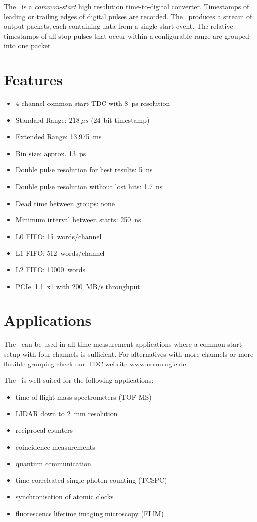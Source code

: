 The \deviceName\ is a \emph{common-start} high resolution time-to-digital converter. 
Timestamps of leading or trailing edges of digital pulses are recorded. 
The \deviceName\ produces a stream of output packets, each containing data from a single start event. 
The relative timestamps of all stop pulses that occur within a configurable range are grouped into one packet.

\section{Features}
	\begin{itemize}
		\item 4 channel common start TDC with 8~ps resolution
		\item Standard Range: $218~\mu s$ (24~bit timestamp)
		\item Extended Range: 13.975~ms
		\item Bin size: approx. 13~ps
		\item Double pulse resolution for best results: 5~ns
		\item Double pulse resolution without lost hits: 1.7~ns
		\item Dead time between groups: none
		\item Minimum interval between starts: 250~ns
		\item L0 FIFO: 15~words/channel
		\item L1 FIFO: 512~words/channel
		\item L2 FIFO: 10000~words
		\item PCIe~1.1~x1 with 200~MB/s throughput
	\end{itemize} 

\section{Applications}
The \deviceName\ can be used in all time measurement applications where a common start setup with four channels is sufficient. 
For alternatives with more channels or more flexible grouping check our TDC website \href{https://www.cronologic.de/produkte/products-overview#tdcdata}{www.cronologic.de}.

The \deviceName\ is well suited for the following applications:
\begin{itemize}
	\item time of flight mass spectrometers (TOF-MS)
	\item LIDAR down to 2~mm resolution
	\item reciprocal counters
	\item coincidence measurements
	\item quantum communication
	\item time correleated single photon counting (TCSPC)
	\item synchronisation of atomic clocks
	\item fluorescence lifetime imaging microscopy (FLIM)
\end{itemize} 